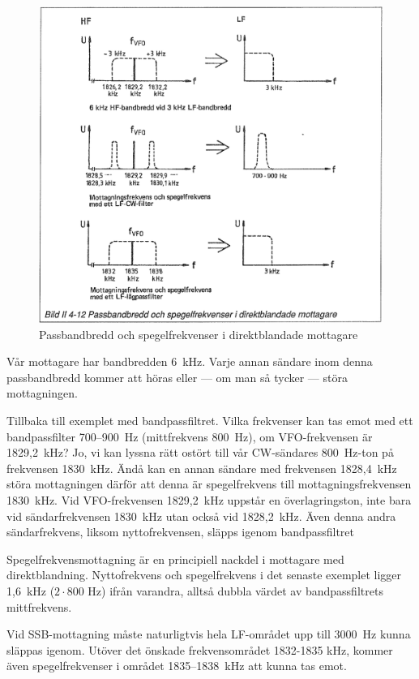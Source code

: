 \begin{figure}
  \includegraphics[width=\textwidth]{images/bild_2_4-12}
  \caption{Passbandbredd och spegelfrekvenser i direktblandade mottagare}
  \label{fig:bildII4-12}
\end{figure}

Vår mottagare har bandbredden 6~kHz. Varje annan sändare inom denna
passbandbredd kommer att höras eller --- om man så tycker --- störa
mottagningen.

Tillbaka till exemplet med bandpassfiltret. Vilka frekvenser kan tas
emot med ett bandpassfilter 700--900~Hz (mittfrekvens 800~Hz), om
VFO-frekvensen är 1829,2~kHz?  Jo, vi kan lyssna rätt ostört till vår
CW-sändares 800~Hz-ton på frekvensen 1830~kHz. Ändå kan en annan
sändare med frekvensen 1828,4~kHz störa mottagningen därför att denna
är spegelfrekvens till mottagningsfrekvensen 1830~kHz. Vid
VFO-frekvensen 1829,2~kHz uppstår en överlagringston, inte bara vid
sändarfrekvensen 1830~kHz utan också vid 1828,2~kHz. Även denna andra
sändarfrekvens, liksom nyttofrekvensen, släpps igenom bandpassfiltret

Spegelfrekvensmottagning är en principiell nackdel i mottagare med
direktblandning. Nyttofrekvens och spegelfrekvens i det senaste
exemplet ligger 1,6~kHz (\(2 \cdot 800\) Hz) ifrån varandra, alltså
dubbla värdet av bandpassfiltrets mittfrekvens.

Vid SSB-mottagning måste naturligtvis hela LF-området upp till 3000~Hz
kunna släppas igenom. Utöver det önskade frekvensområdet 1832-1835
kHz, kommer även spegelfrekvenser i området 1835--1838~kHz att kunna
tas emot.

